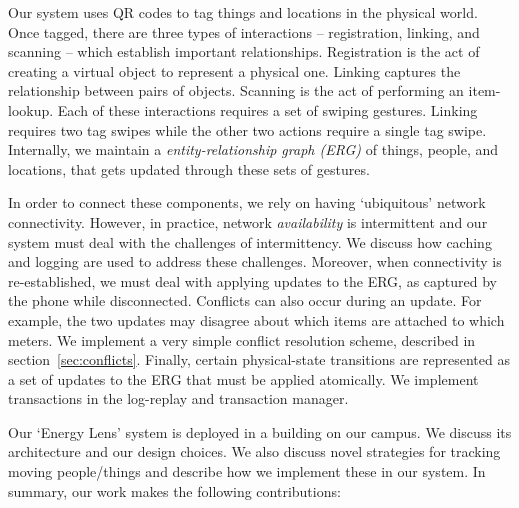 Our system uses QR codes to tag things and locations in the physical world.  Once tagged, there are three types of interactions -- 
registration, linking, and scanning -- which establish important relationships.  Registration is the act of creating a virtual object 
to represent a physical one.  Linking captures the relationship between pairs of objects.  Scanning is the act of performing an item-lookup.
Each of these interactions requires a set of swiping gestures.  Linking requires two tag swipes while the other two actions
require a single tag swipe.  Internally, we maintain a \emph{entity-relationship graph (ERG)} of things, people, and locations, that gets
updated through these sets of gestures.

In order to connect these components, we rely on having `ubiquitous' network connectivity.  However, in practice, network
\emph{availability} is intermittent and our system must deal with the challenges of intermittency.  We discuss how caching
and logging are used to address these challenges.  Moreover, when connectivity is re-established, we must deal with
applying updates to the ERG, as captured by the phone while disconnected.  
Conflicts can also occur during an update.  For example, the two updates may disagree about which items are attached
to which meters.  We implement a very simple conflict resolution scheme, described in section~\ref{sec:conflicts}.
Finally, certain physical-state transitions are represented as a set of updates to the ERG that must be applied 
atomically.  We implement transactions in the log-replay and transaction manager.

Our `Energy Lens' system is deployed in a building on our campus.  We discuss
its architecture and our design choices.  
We also discuss novel strategies for tracking moving people/things and describe how we implement these in our system.  In summary, our work
makes the following contributions:

